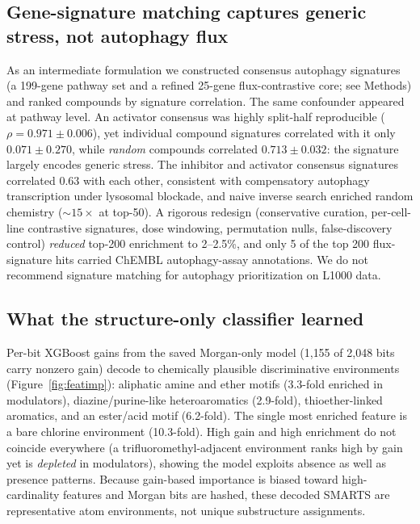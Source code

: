 \documentclass[11pt]{article}
\newcommand{\rpm}{\ensuremath{\rho}}
\begin{document}
\subsection*{Gene-signature matching captures generic stress, not autophagy flux}

As an intermediate formulation we constructed consensus autophagy signatures
(a 199-gene pathway set and a refined 25-gene flux-contrastive core; see
Methods) and ranked compounds by signature correlation. The same confounder
appeared at pathway level. An activator consensus was highly split-half
reproducible ($\rpm=0.971\pm0.006$), yet individual compound signatures
correlated with it only $0.071\pm0.270$, while \emph{random} compounds
correlated $0.713\pm0.032$: the signature largely encodes generic stress. The
inhibitor and activator consensus signatures correlated $0.63$ with each
other, consistent with compensatory autophagy transcription under lysosomal
blockade, and naive inverse search enriched random chemistry
(${\sim}15\times$ at top-50). A rigorous redesign (conservative curation,
per-cell-line contrastive signatures, dose windowing, permutation nulls,
false-discovery control) \emph{reduced} top-200 enrichment to 2--2.5\%, and
only 5 of the top 200 flux-signature hits carried ChEMBL autophagy-assay
annotations. We do not recommend signature matching for autophagy
prioritization on L1000 data.

\subsection*{What the structure-only classifier learned}

Per-bit XGBoost gains from the saved Morgan-only model (1{,}155 of 2{,}048
bits carry nonzero gain) decode to chemically plausible discriminative
environments (Figure~\ref{fig:featimp}): aliphatic amine and ether motifs
(3.3-fold enriched in modulators), diazine/purine-like heteroaromatics
(2.9-fold), thioether-linked aromatics, and an ester/acid motif (6.2-fold).
The single most enriched feature is a bare chlorine environment (10.3-fold).
High gain and high enrichment do not coincide everywhere (a
trifluoromethyl-adjacent environment ranks high by gain yet is
\emph{depleted} in modulators), showing the model exploits absence as well as
presence patterns. Because gain-based importance is biased toward
high-cardinality features and Morgan bits are hashed, these decoded SMARTS
are representative atom environments, not unique substructure assignments.
\end{document}
